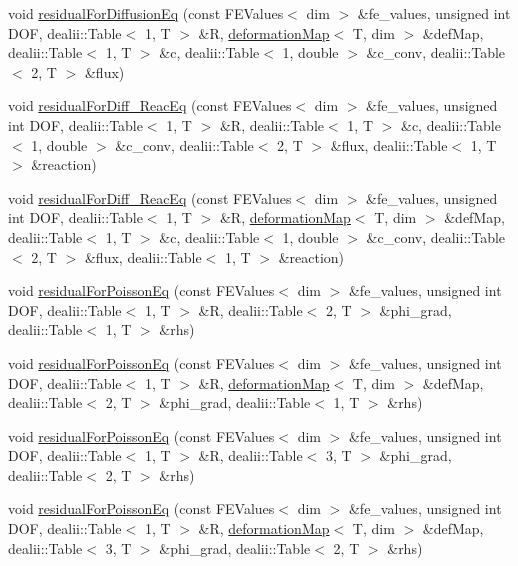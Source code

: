 \begin{DoxyCompactItemize}
\item 
void \hyperlink{class_residual_a69b8ab1cc85ae177f9c627b60b1b8468}{residual\-For\-Diffusion\-Eq} (const F\-E\-Values$<$ dim $>$ \&fe\-\_\-values, unsigned int D\-O\-F, dealii\-::\-Table$<$ 1, T $>$ \&R, \hyperlink{structdeformation_map}{deformation\-Map}$<$ T, dim $>$ \&def\-Map, dealii\-::\-Table$<$ 1, T $>$ \&c, dealii\-::\-Table$<$ 1, double $>$ \&c\-\_\-conv, dealii\-::\-Table$<$ 2, T $>$ \&flux)
\item 
void \hyperlink{class_residual_a144663fb81fc60d4db0c5a8e45176e61}{residual\-For\-Diff\-\_\-\-Reac\-Eq} (const F\-E\-Values$<$ dim $>$ \&fe\-\_\-values, unsigned int D\-O\-F, dealii\-::\-Table$<$ 1, T $>$ \&R, dealii\-::\-Table$<$ 1, T $>$ \&c, dealii\-::\-Table$<$ 1, double $>$ \&c\-\_\-conv, dealii\-::\-Table$<$ 2, T $>$ \&flux, dealii\-::\-Table$<$ 1, T $>$ \&reaction)
\item 
void \hyperlink{class_residual_aa88dcdddfeefb2ba5f1f1196d8608b70}{residual\-For\-Diff\-\_\-\-Reac\-Eq} (const F\-E\-Values$<$ dim $>$ \&fe\-\_\-values, unsigned int D\-O\-F, dealii\-::\-Table$<$ 1, T $>$ \&R, \hyperlink{structdeformation_map}{deformation\-Map}$<$ T, dim $>$ \&def\-Map, dealii\-::\-Table$<$ 1, T $>$ \&c, dealii\-::\-Table$<$ 1, double $>$ \&c\-\_\-conv, dealii\-::\-Table$<$ 2, T $>$ \&flux, dealii\-::\-Table$<$ 1, T $>$ \&reaction)
\item 
void \hyperlink{class_residual_af1d58eecf6eeae74de2f7ebc6a158b18}{residual\-For\-Poisson\-Eq} (const F\-E\-Values$<$ dim $>$ \&fe\-\_\-values, unsigned int D\-O\-F, dealii\-::\-Table$<$ 1, T $>$ \&R, dealii\-::\-Table$<$ 2, T $>$ \&phi\-\_\-grad, dealii\-::\-Table$<$ 1, T $>$ \&rhs)
\item 
void \hyperlink{class_residual_ad457db9bcfe7ff4d134642440cd1c4e6}{residual\-For\-Poisson\-Eq} (const F\-E\-Values$<$ dim $>$ \&fe\-\_\-values, unsigned int D\-O\-F, dealii\-::\-Table$<$ 1, T $>$ \&R, \hyperlink{structdeformation_map}{deformation\-Map}$<$ T, dim $>$ \&def\-Map, dealii\-::\-Table$<$ 2, T $>$ \&phi\-\_\-grad, dealii\-::\-Table$<$ 1, T $>$ \&rhs)
\item 
void \hyperlink{class_residual_ad1d5fc375c6f93d9aad89fc1cf9fd25f}{residual\-For\-Poisson\-Eq} (const F\-E\-Values$<$ dim $>$ \&fe\-\_\-values, unsigned int D\-O\-F, dealii\-::\-Table$<$ 1, T $>$ \&R, dealii\-::\-Table$<$ 3, T $>$ \&phi\-\_\-grad, dealii\-::\-Table$<$ 2, T $>$ \&rhs)
\item 
void \hyperlink{class_residual_ada0899a86c88ceb84cc3c1155663b8ba}{residual\-For\-Poisson\-Eq} (const F\-E\-Values$<$ dim $>$ \&fe\-\_\-values, unsigned int D\-O\-F, dealii\-::\-Table$<$ 1, T $>$ \&R, \hyperlink{structdeformation_map}{deformation\-Map}$<$ T, dim $>$ \&def\-Map, dealii\-::\-Table$<$ 3, T $>$ \&phi\-\_\-grad, dealii\-::\-Table$<$ 2, T $>$ \&rhs)

\end{DoxyCompactItemize}

